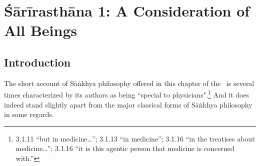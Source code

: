 
\chapter{Śārīrasthāna 1:  A Consideration of All Beings}

\section{Introduction}


The short account of Sāṅkhya philosophy offered in this chapter of the
\SS\ is several times characterized by its authors as being ``special to
physicians".\footnote{3.1.11  ``but in
    medicine\ldots''; 3.1.13  ``in medicine''; 3.1.16
     ``in the treatises about medicine\ldots '';
    3.1.16  ``it is this agentic
    person that medicine is concerned with.''}  And it does indeed stand
    slightly apart from the major classical forms of Sāṅkhya philosophy in
    some regards.

